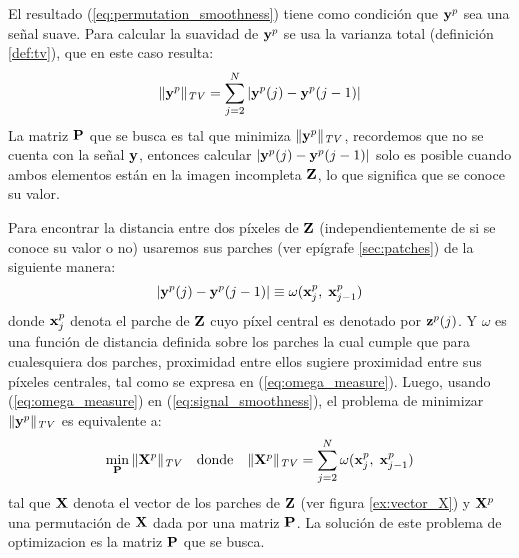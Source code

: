 El resultado (\ref{eq:permutation_smoothness}) tiene como condici\'on que $\y^p$ sea una señal suave. Para calcular la suavidad de $\y^p$ se usa la varianza total (definici\'on \ref{def:tv}), que en este caso resulta:
\begin{equation}
	\|\y^p\|_{\mathit{TV}} = \sum_{j = 2}^{N}|\y^{p}(j) - \y^{p}(j - 1)|
	\label{eq:signal_smoothness}
\end{equation}
La matriz $\P$ que se busca es tal que minimiza $\|\y^p\|_{\mathit{TV}}$, recordemos que no se cuenta con la señal  $\y$, entonces calcular $|\y^{p}(j) - \y^{p}(j - 1)|$ solo es posible cuando ambos elementos est\'an en la imagen incompleta $\Z$, lo que significa que se conoce su valor.

Para encontrar la distancia entre dos p\'ixeles de $\Z$ (independientemente de si se conoce su valor o no) usaremos sus parches (ver epígrafe \ref{sec:patches}) de la siguiente manera:
\begin{equation}
	|\y^{p}(j) - \y^{p}(j - 1)| \equiv \omega(\x_j^p,\; \x_{j - 1}^p)
	\label{eq:omega_measure}
\end{equation}
donde $\x_j^p$ denota el parche de $\Z$ cuyo p\'ixel central es denotado por $\z^p(j)$. Y $\omega$ es una funci\'on de distancia definida sobre los parches la cual cumple que para cualesquiera dos parches, proximidad entre ellos sugiere proximidad entre sus p\'ixeles centrales, tal como se expresa en (\ref{eq:omega_measure}). Luego, usando (\ref{eq:omega_measure}) en (\ref{eq:signal_smoothness}), el problema de minimizar $\|\y^p\|_{\mathit{TV}}$ es equivalente a:
\begin{equation}
	\begin{array}{ccc}
		\displaystyle\min_\P \|\X^p\|_{\mathit{TV}} & \mbox{donde} & \|\X^p\|_{\mathit{TV}}  = \displaystyle\sum_{j = 2}^{N}\omega(\x_j^{p},\; \x_{j - 1}^{p})
	\end{array}
	\label{eq:path_smoothness}
\end{equation}
tal que $\X$ denota el vector de los parches de $\Z$ (ver figura \ref{ex:vector_X}) y $\X^p$ una permutaci\'on de $\X$ dada por una matriz $\P$. La soluci\'on de este problema de optimizacion es la matriz $\P$ que se busca.
